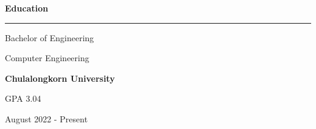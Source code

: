 \documentclass[10pt]{article}
\begin{document}
    \noindent
    \begin{minipage}{\textwidth}
        \large\textbf{Education}\par
        \vspace{0.25em}
        \nointerlineskip
        \noindent
        \rule{0.25\textwidth}{0.4pt}
        \par

        \vspace{0.75em}
        \hspace{2em}
        \begin{minipage}{0.45\textwidth}
            \normalsize{Bachelor of Engineering}\par
            \normalsize{Computer Engineering}\par
            \normalsize\textbf{Chulalongkorn University}\par
            \vspace{0.125em}
            \footnotesize{GPA 3.04}\par
        \end{minipage}
        \hfill
        \begin{minipage}{0.20\textwidth}
            \normalsize{August 2022 - Present}\par
        \end{minipage}
    \end{minipage}
\end{document}

